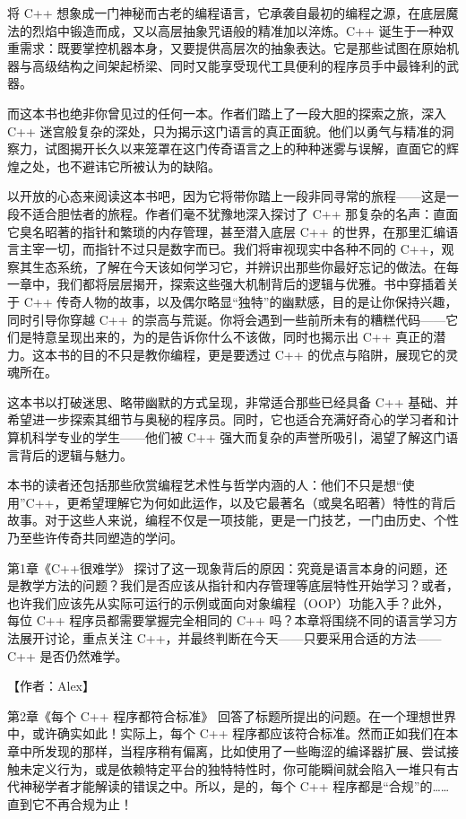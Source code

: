 将 C++ 想象成一门神秘而古老的编程语言，它承袭自最初的编程之源，在底层魔法的烈焰中锻造而成，又以高层抽象咒语般的精准加以淬炼。C++ 诞生于一种双重需求：既要掌控机器本身，又要提供高层次的抽象表达。它是那些试图在原始机器与高级结构之间架起桥梁、同时又能享受现代工具便利的程序员手中最锋利的武器。

而这本书也绝非你曾见过的任何一本。作者们踏上了一段大胆的探索之旅，深入 C++ 迷宫般复杂的深处，只为揭示这门语言的真正面貌。他们以勇气与精准的洞察力，试图揭开长久以来笼罩在这门传奇语言之上的种种迷雾与误解，直面它的辉煌之处，也不避讳它所被认为的缺陷。

以开放的心态来阅读这本书吧，因为它将带你踏上一段非同寻常的旅程——这是一段不适合胆怯者的旅程。作者们毫不犹豫地深入探讨了 C++ 那复杂的名声：直面它臭名昭著的指针和繁琐的内存管理，甚至潜入底层 C++ 的世界，在那里汇编语言主宰一切，而指针不过只是数字而已。我们将审视现实中各种不同的 C++，观察其生态系统，了解在今天该如何学习它，并辨识出那些你最好忘记的做法。在每一章中，我们都将层层揭开，探索这些强大机制背后的逻辑与优雅。书中穿插着关于 C++ 传奇人物的故事，以及偶尔略显“独特”的幽默感，目的是让你保持兴趣，同时引导你穿越 C++ 的崇高与荒诞。你将会遇到一些前所未有的糟糕代码——它们是特意呈现出来的，为的是告诉你什么不该做，同时也揭示出 C++ 真正的潜力。这本书的目的不只是教你编程，更是要透过 C++ 的优点与陷阱，展现它的灵魂所在。


这本书以打破迷思、略带幽默的方式呈现，非常适合那些已经具备 C++ 基础、并希望进一步探索其细节与奥秘的程序员。同时，它也适合充满好奇心的学习者和计算机科学专业的学生——他们被 C++ 强大而复杂的声誉所吸引，渴望了解这门语言背后的逻辑与魅力。

本书的读者还包括那些欣赏编程艺术性与哲学内涵的人：他们不只是想“使用”C++，更希望理解它为何如此运作，以及它最著名（或臭名昭著）特性的背后故事。对于这些人来说，编程不仅是一项技能，更是一门技艺，一门由历史、个性乃至些许传奇共同塑造的学问。


第1章《C++很难学》 探讨了这一现象背后的原因：究竟是语言本身的问题，还是教学方法的问题？我们是否应该从指针和内存管理等底层特性开始学习？或者，也许我们应该先从实际可运行的示例或面向对象编程（OOP）功能入手？此外，每位 C++ 程序员都需要掌握完全相同的 C++ 吗？本章将围绕不同的语言学习方法展开讨论，重点关注 C++，并最终判断在今天——只要采用合适的方法——C++ 是否仍然难学。

【作者：Alex】

第2章《每个 C++ 程序都符合标准》 回答了标题所提出的问题。在一个理想世界中，或许确实如此！实际上，每个 C++ 程序都应该符合标准。然而正如我们在本章中所发现的那样，当程序稍有偏离，比如使用了一些晦涩的编译器扩展、尝试接触未定义行为，或是依赖特定平台的独特特性时，你可能瞬间就会陷入一堆只有古代神秘学者才能解读的错误之中。所以，是的，每个 C++ 程序都是“合规”的……直到它不再合规为止！

